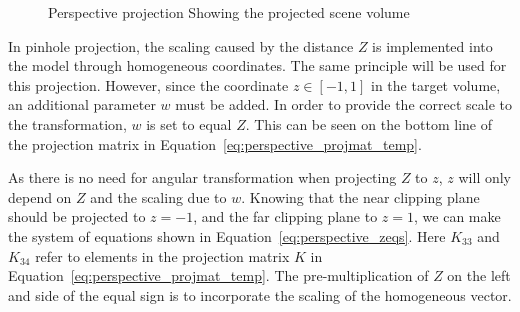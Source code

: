\begin{figure}[!htb]
    \caption{Perspective projection Showing the projected scene volume}
    \label{fig:theory_perspective_projection_volume}
\end{figure}

In pinhole projection, the scaling caused by the distance $Z$ is implemented into the model through homogeneous coordinates. The same principle will be used for this projection. However, since the coordinate $z \in [-1,1]$ in the target volume, an additional parameter $w$ must be added. In order to provide the correct scale to the transformation, $w$ is set to equal $Z$. This can be seen on the bottom line of the projection matrix in Equation~\eqref{eq:perspective_projmat_temp}.

As there is no need for angular transformation when projecting $Z$ to $z$, $z$ will only depend on $Z$ and the scaling due to $w$. Knowing that the near clipping plane should be projected to $z=-1$, and the far clipping plane to $z=1$, we can make the system of equations shown in Equation~\eqref{eq:perspective_zeqs}. Here $K_{33}$ and $K_{34}$ refer to elements in the projection matrix $K$ in Equation~\eqref{eq:perspective_projmat_temp}. The pre-multiplication of $Z$ on the left and side of the equal sign is to incorporate the scaling of the homogeneous vector.


